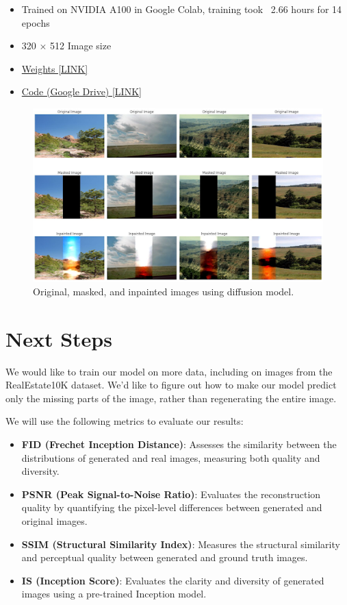 \documentclass[sigconf]{acmart}
\begin{document}
\begin{itemize}
    \item Trained on NVIDIA A100 in Google Colab, training took ~2.66 hours for 14 epochs
    \item 320 $\times$ 512 Image size
    \item \href{https://drive.google.com/file/d/1-wr7a01nVmRRFrYpwbjaQlc0FIDKINvY/view?usp=sharing}{Weights [LINK]}
    \item \href{https://colab.research.google.com/drive/1XZfe98Ox-r8rhJx-8WGiJiJjFm-hb6yO?authuser=2}{Code (Google Drive) [LINK]}
\end{itemize}

\begin{figure}[h]
    \centering
    \includegraphics[width=0.8\linewidth]{diffusion_results.png}
    \caption{Original, masked, and inpainted images using diffusion model.}
\end{figure}

\section*{Next Steps}
We would like to train our model on more data, including on images from the RealEstate10K dataset. We’d like to figure out how to make our model predict only the missing parts of the image, rather than regenerating the entire image.

We will use the following metrics to evaluate our results:
\begin{itemize}
    \item \textbf{FID (Frechet Inception Distance)}: Assesses the similarity between the distributions of generated and real images, measuring both quality and diversity.
    \item \textbf{PSNR (Peak Signal-to-Noise Ratio)}: Evaluates the reconstruction quality by quantifying the pixel-level differences between generated and original images.
    \item \textbf{SSIM (Structural Similarity Index)}: Measures the structural similarity and perceptual quality between generated and ground truth images.
    \item \textbf{IS (Inception Score)}: Evaluates the clarity and diversity of generated images using a pre-trained Inception model.
\end{itemize}
\end{document}
